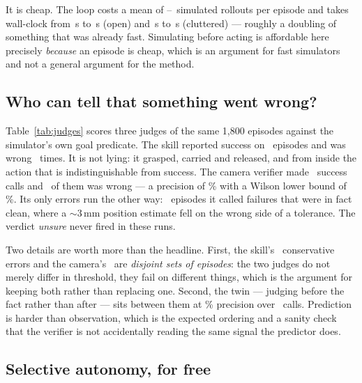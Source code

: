 \documentclass[11pt,a4paper]{article}
\begin{document}
It is cheap. The loop costs a mean of \numLoopOpenSims--\numLoopClutSims\
simulated rollouts per episode and takes wall-clock from \numDirectOpenSecs\,s to
\numLoopOpenSecs\,s (open) and \numDirectClutSecs\,s to \numLoopClutSecs\,s
(cluttered) --- roughly a doubling of something that was already fast. Simulating
before acting is affordable here precisely \emph{because} an episode is cheap,
which is an argument for fast simulators and not a general argument for the
method.



\subsection{Who can tell that something went wrong?}
\label{sec:judges}

Table~\ref{tab:judges} scores three judges of the same 1{,}800 episodes against
the simulator's own goal predicate. The skill reported success on
\numJudgeSkillSaid\ episodes and was wrong \numJudgeSkillWrong\ times. It is not
lying: it grasped, carried and released, and from inside the action that is
indistinguishable from success. The camera verifier made \numJudgeCameraSaid\
success calls and \numJudgeCameraWrong\ of them was wrong --- a precision of
\numJudgeCameraPrec\% with a Wilson lower bound of \numJudgeCameraPrecLo\%. Its
only errors run the other way: \numJudgeCameraMiss\ episodes it called failures
that were in fact clean, where a $\sim$3\,mm position estimate fell on the wrong
side of a tolerance. The verdict \emph{unsure} never fired in these runs.

Two details are worth more than the headline. First, the skill's
\numJudgeSkillMiss\ conservative errors and the camera's \numJudgeCameraMiss\ are
\emph{disjoint sets of episodes}: the two judges do not merely differ in
threshold, they fail on different things, which is the argument for keeping both
rather than replacing one. Second, the twin --- judging before the fact rather
than after --- sits between them at \numJudgeTwinPrec\% precision over
\numJudgeTwinSaid\ calls. Prediction is harder than observation, which is the
expected ordering and a sanity check that the verifier is not accidentally
reading the same signal the predictor does.

\subsection{Selective autonomy, for free}
\label{sec:selective}
\end{document}
